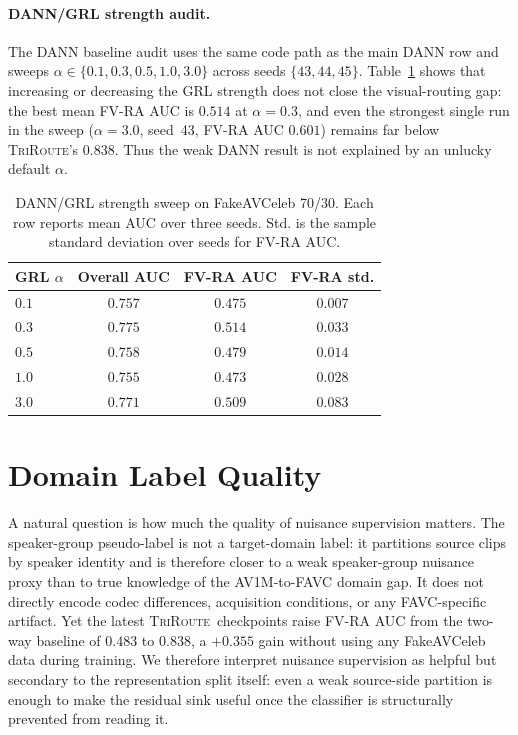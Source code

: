 \documentclass{article}
\newcommand{\method}{\textsc{TriRoute}}
\begin{document}
\paragraph{DANN/GRL strength audit.}
The DANN baseline audit uses the same code path as the main DANN row and sweeps $\alpha \in \{0.1,0.3,0.5,1.0,3.0\}$ across seeds $\{43,44,45\}$. Table~\ref{tab:dann_alpha_sweep} shows that increasing or decreasing the GRL strength does not close the visual-routing gap: the best mean FV-RA AUC is $0.514$ at $\alpha=0.3$, and even the strongest single run in the sweep ($\alpha=3.0$, seed~43, FV-RA AUC $0.601$) remains far below \method's $0.838$. Thus the weak DANN result is not explained by an unlucky default $\alpha$.

\begin{table}[h]
    \centering
    \caption{DANN/GRL strength sweep on FakeAVCeleb 70/30. Each row reports mean AUC over three seeds. Std. is the sample standard deviation over seeds for FV-RA AUC.}
    \label{tab:dann_alpha_sweep}
    \small
    \begin{tabular}{lccc}
        \toprule
        GRL $\alpha$ & Overall AUC & \textbf{FV-RA AUC} & FV-RA std. \\
        \midrule
        $0.1$ & $0.757$ & $0.475$ & $0.007$ \\
        $0.3$ & $\mathbf{0.775}$ & $\mathbf{0.514}$ & $0.033$ \\
        $0.5$ & $0.758$ & $0.479$ & $0.014$ \\
        $1.0$ & $0.755$ & $0.473$ & $0.028$ \\
        $3.0$ & $0.771$ & $0.509$ & $0.083$ \\
        \bottomrule
    \end{tabular}
\end{table}

\section{Domain Label Quality}
\label{app:domain_label_quality}

A natural question is how much the quality of nuisance supervision matters. The speaker-group pseudo-label is not a target-domain label: it partitions source clips by speaker identity and is therefore closer to a weak speaker-group nuisance proxy than to true knowledge of the AV1M-to-FAVC domain gap. It does not directly encode codec differences, acquisition conditions, or any FAVC-specific artifact. Yet the latest \method\ checkpoints raise FV-RA AUC from the two-way baseline of $0.483$ to $0.838$, a $+0.355$ gain without using any FakeAVCeleb data during training. We therefore interpret nuisance supervision as helpful but secondary to the representation split itself: even a weak source-side partition is enough to make the residual sink useful once the classifier is structurally prevented from reading it.
\end{document}
